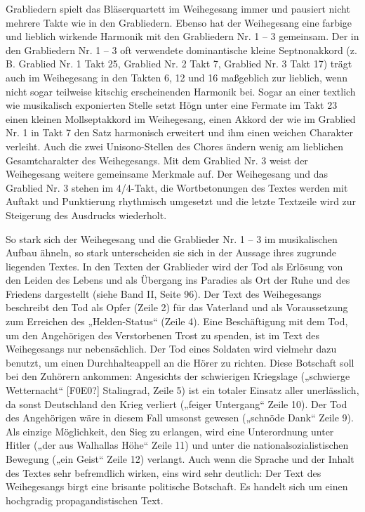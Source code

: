 Grabliedern spielt das Bläserquartett im Weihegesang immer und pausiert
nicht mehrere Takte wie in den Grabliedern. \newline
Ebenso hat der Weihegesang eine farbige und lieblich wirkende Harmonik
mit den Grabliedern Nr. 1 – 3 gemeinsam. Der in den Grabliedern Nr. 1 –
3 oft verwendete dominantische kleine Septnonakkord (z. B. Grablied Nr.
1 Takt 25, Grablied Nr. 2 Takt 7, Grablied Nr. 3 Takt 17) trägt auch im
Weihegesang in den Takten 6, 12 und 16 maßgeblich zur lieblich, wenn
nicht sogar teilweise kitschig erscheinenden Harmonik bei. Sogar an
einer textlich wie musikalisch exponierten Stelle setzt Högn unter eine
Fermate im Takt 23 einen kleinen Mollseptakkord im Weihegesang, einen
Akkord der wie im Grablied Nr. 1 in Takt 7 den Satz harmonisch
erweitert und ihm einen weichen Charakter verleiht. Auch die zwei
Unisono-Stellen des Chores ändern wenig am lieblichen Gesamtcharakter
des Weihegesangs. Mit dem Grablied Nr. 3 weist der Weihegesang weitere
gemeinsame Merkmale auf. Der Weihegesang und das Grablied Nr. 3 stehen
im 4/4-Takt, die Wortbetonungen des Textes werden mit Auftakt und
Punktierung rhythmisch umgesetzt und die letzte Textzeile wird zur
Steigerung des Ausdrucks wiederholt.

So stark sich der Weihegesang und die Grablieder Nr. 1 – 3 im
musikalischen Aufbau ähneln, so stark unterscheiden sie sich in der
Aussage ihres zugrunde liegenden Textes. In den Texten der Grablieder
wird der Tod als Erlösung von den Leiden des Lebens und als Übergang
ins Paradies als Ort der Ruhe und des Friedens dargestellt (siehe Band
II, Seite 96). Der Text des Weihegesangs beschreibt den Tod als Opfer
(Zeile 2) für das Vaterland und als Voraussetzung zum Erreichen des
„Helden-Status“ (Zeile 4). Eine Beschäftigung mit dem Tod, um den
Angehörigen des Verstorbenen Trost zu spenden, ist im Text des
Weihegesangs nur nebensächlich. Der Tod eines Soldaten wird vielmehr
dazu benutzt, um einen Durchhalteappell an die Hörer zu richten. Diese
Botschaft soll bei den Zuhörern ankommen: Angesichts der schwierigen
Kriegslage („schwierge Wetternacht“ [F0E0?] Stalingrad, Zeile 5) ist
ein totaler Einsatz aller unerlässlich, da sonst Deutschland den Krieg
verliert („feiger Untergang“ Zeile 10). Der Tod des Angehörigen wäre in
diesem Fall umsonst gewesen („schnöde Dank“ Zeile 9). Als einzige
Möglichkeit, den Sieg zu erlangen, wird eine Unterordnung unter Hitler
(„der aus Walhallas Höhe“ Zeile 11) und unter die
nationalsozialistischen Bewegung („ein Geist“ Zeile 12) verlangt. Auch
wenn die Sprache und der Inhalt des Textes sehr befremdlich wirken,
eins wird sehr deutlich: Der Text des Weihegesangs birgt eine brisante
politische Botschaft. Es handelt sich um einen hochgradig
propagandistischen Text.

